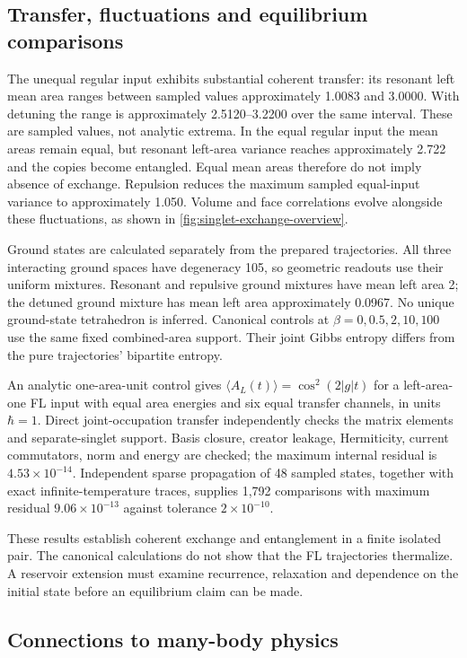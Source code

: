 \documentclass[twocolumn,draft,aps,nofootinbib,nobibnotes,final]{revtex4-2}
\begin{document}
\subsection{Transfer, fluctuations and equilibrium comparisons}

The unequal regular input exhibits substantial coherent transfer: its resonant left mean area ranges between sampled values approximately 1.0083 and 3.0000. With detuning the range is approximately 2.5120--3.2200 over the same interval. These are sampled values, not analytic extrema. In the equal regular input the mean areas remain equal, but resonant left-area variance reaches approximately 2.722 and the copies become entangled. Equal mean areas therefore do not imply absence of exchange. Repulsion reduces the maximum sampled equal-input variance to approximately 1.050. Volume and face correlations evolve alongside these fluctuations, as shown in \autoref{fig:singlet-exchange-overview}.

Ground states are calculated separately from the prepared trajectories. All three interacting ground spaces have degeneracy 105, so geometric readouts use their uniform mixtures. Resonant and repulsive ground mixtures have mean left area 2; the detuned ground mixture has mean left area approximately 0.0967. No unique ground-state tetrahedron is inferred. Canonical controls at $\beta=0,0.5,2,10,100$ use the same fixed combined-area support. Their joint Gibbs entropy differs from the pure trajectories' bipartite entropy.

An analytic one-area-unit control gives $\langle A_L(t)\rangle=\cos^2(2|g|t)$ for a left-area-one FL input with equal area energies and six equal transfer channels, in units $\hbar=1$. Direct joint-occupation transfer independently checks the matrix elements and separate-singlet support. Basis closure, creator leakage, Hermiticity, current commutators, norm and energy are checked; the maximum internal residual is $4.53\times10^{-14}$. Independent sparse propagation of 48 sampled states, together with exact infinite-temperature traces, supplies 1,792 comparisons with maximum residual $9.06\times10^{-13}$ against tolerance $2\times10^{-10}$.

These results establish coherent exchange and entanglement in a finite isolated pair. The canonical calculations do not show that the FL trajectories thermalize. A reservoir extension must examine recurrence, relaxation and dependence on the initial state before an equilibrium claim can be made.

\subsection{Connections to many-body physics}
\end{document}
